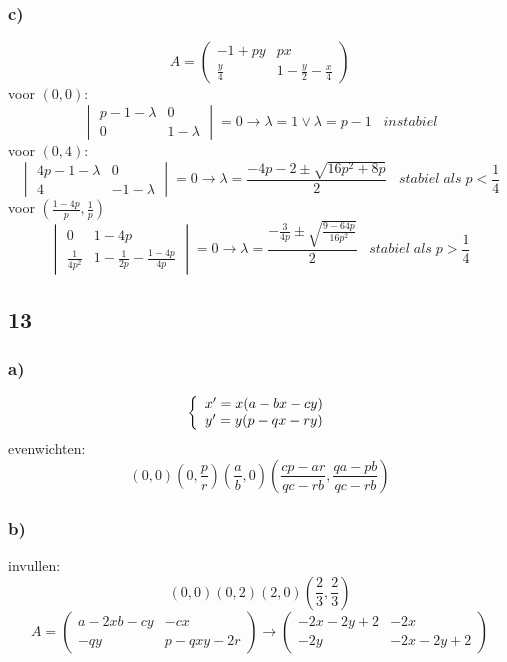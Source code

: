 \documentclass[11pt]{article}
\begin{document}
\subsubsection*{c)}
\[
A=
\begin{pmatrix}
-1+py & px\\
\frac{y}{4} & 1-\frac{y}{2}-\frac{x}{4}
\end{pmatrix}
\]
voor $(0,0)$:
\[
\begin{vmatrix}
p-1-\lambda & 0 \\
0 & 1-\lambda
\end{vmatrix}
=0
\longrightarrow \lambda=1 \vee \lambda=p-1
\;\;\; instabiel
\]
voor $(0,4)$:
\[
\begin{vmatrix}
4p-1-\lambda & 0\\
4 & -1-\lambda
\end{vmatrix}
=0
\longrightarrow
\lambda = \frac{-4p-2 \pm \sqrt{16p^2+8p}}{2}
\;\;\; stabiel\;als\;p<\frac{1}{4}
\]
voor $(\frac{1-4p}{p},\frac{1}{p})$
\[
\begin{vmatrix}
0 & 1-4p\\
\frac{1}{4p^2} & 1-\frac{1}{2p}-\frac{1-4p}{4p}
\end{vmatrix}
=0
\longrightarrow
\lambda = \frac{-\frac{3}{4p} \pm \sqrt{\frac{9-64p}{16p^2}}}{2}
\;\;\; stabiel\;als\;p>\frac{1}{4}
\]

\subsection*{13}
\subsubsection*{a)}
\[
\left\lbrace
\begin{array}{c c}
x' = x(a-bx-cy)\\
y' = y(p-qx-ry)
\end{array}
\right.
\]
evenwichten: 
\[
(0,0) (0,\frac{p}{r}) (\frac{a}{b},0) (\frac{cp-ar}{qc-rb},\frac{qa-pb}{qc-rb})
\]

\subsubsection*{b)}
invullen:
\[
(0,0) (0,2) (2,0) (\frac{2}{3},\frac{2}{3})
\]
\[
A = 
\begin{pmatrix}
a-2xb-cy & -cx\\
-qy & p-qxy-2r
\end{pmatrix}
\longrightarrow
\begin{pmatrix}
-2x-2y+2 & -2x\\
-2y & -2x-2y+2
\end{pmatrix}
\]
\end{document}
